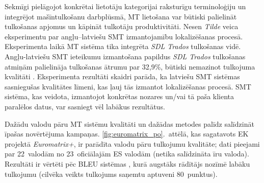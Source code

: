 \begin{multicols}{2}
Sekmīgi pielāgojot konkrētai lietotāju kategorijai raksturīgu terminoloģiju un integrējot mašīntulkošanu darbplūsmā, MT lietošana var būtiski palielināt tulkošanas apjomus un kāpināt tulkotāju produktivitāti.
Nesen \textit{Tilde} veica eksperimentu par angļu--latviešu SMT izmantojamību lokalizēšanas procesā.
Eksperimenta laikā MT sistēma tika integrēta \textit{SDL Trados} tulkošanas vidē.
Angļu-latviešu SMT ieteikumu izmantošana papildus \textit{SDL Trados} tulkošanas atmiņām palielināja tulkošanas ātrumu par 32,9\%, būtiski nemazinot tulkojuma kvalitāti \cite{Meta35}.
Eksperimenta rezultāti skaidri parāda, ka latviešu SMT sistēmas sasniegušas kvalitātes līmeni, kas ļauj tās izmantot lokalizēšanas procesā. 
SMT sistēma, kas veidota, izmantojot konkrētas nozares un/vai tā paša klienta paralēlos datus, var sasniegt vēl labākus rezultātus.

Dažādu valodu pāru MT sistēmu kvalitāti un dažādas metodes palīdz salīdzināt īpašas novērtējuma kampaņas.
\ref{fig:euromatrix_po}.~attēlā, kas sagatavots EK projektā \textit{Euromatrix+}, ir parādīta valodu pāru tulkojumu kvalitāte; dati pieejami par 22~valodām no 23~oficiālajām ES valodām (netika salīdzināta īru valoda).
Rezultāti ir vērtēti pēc BLEU sistēmas \cite{Meta36}, kurā augstāks rādītājs nozīmē labāku tulkojumu (cilvēka veikts tulkojums saņemtu aptuveni 80~punktus). 


\end{multicols}
